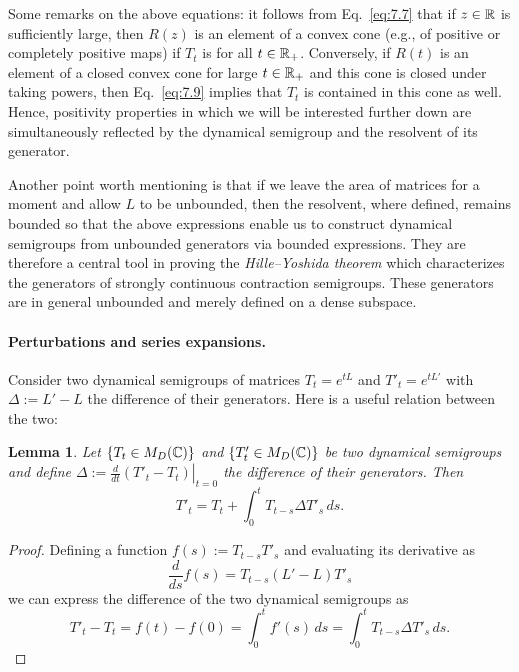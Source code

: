 \documentclass[11pt,a4paper]{article}
\theoremstyle{plain}
\newtheorem{lemma}{Lemma}
\begin{document}
Some remarks on the above equations: it follows from Eq.~\eqref{eq:7.7} that if $z\in\mathbb{R}$ is sufficiently large, then $R(z)$ is an element of a convex cone (e.g., of positive or completely positive maps) if $T_t$ is for all $t\in\mathbb{R}_{+}$. Conversely, if $R(t)$ is an element of a closed convex cone for large $t\in\mathbb{R}_{+}$ and this cone is closed under taking powers, then Eq.~\eqref{eq:7.9} implies that $T_t$ is contained in this cone as well. Hence, positivity properties in which we will be interested further down are simultaneously reflected by the dynamical semigroup and the resolvent of its generator.

Another point worth mentioning is that if we leave the area of matrices for a moment and allow $L$ to be unbounded, then the resolvent, where defined, remains bounded so that the above expressions enable us to construct dynamical semigroups from unbounded generators via bounded expressions. They are therefore a central tool in proving the \emph{Hille--Yoshida theorem} which characterizes the generators of strongly continuous contraction semigroups. These generators are in general unbounded and merely defined on a dense subspace.

\paragraph{Perturbations and series expansions.}
Consider two dynamical semigroups of matrices $T_t=e^{tL}$ and $T'_t=e^{tL'}$ with $\Delta:=L'-L$ the difference of their generators. Here is a useful relation between the two:

\begin{lemma}
    Let $\{T_t\in M_D(\mathbb{C})\}$ and $\{T'_t\in M_D(\mathbb{C})\}$ be two dynamical semigroups and define $\Delta := \left.\frac{d}{dt}(T'_t-T_t)\right|_{t=0}$ the difference of their generators. Then
    \begin{equation}\label{eq:7.10}
        T'_t = T_t + \int_0^t T_{t-s}\Delta T'_s\,ds.
    \end{equation}
\end{lemma}

\begin{proof}
    Defining a function $f(s):=T_{t-s}T'_s$ and evaluating its derivative as
    \[
        \frac{d}{ds}f(s)=T_{t-s}(L'-L)T'_s
    \]
    we can express the difference of the two dynamical semigroups as
    \begin{equation}\label{eq:7.11}
        T'_t-T_t = f(t)-f(0)
        = \int_0^t f'(s)\,ds
        = \int_0^t T_{t-s}\Delta T'_s\,ds.
    \end{equation}
\end{proof}
\end{document}
